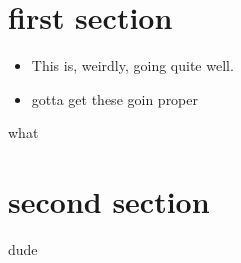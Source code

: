 \documentclass{shard}
\begin{document}
    \section{first section}
    \begin{frame}
        \begin{itemize}
            \item[\bdot]\;\;This is, weirdly, going quite well.
            \item[\bdot]\;\;gotta get these goin proper
        \end{itemize}
    \end{frame}
    \begin{frame}
        what
    \end{frame}
    \section{second section}
    \begin{frame}
        dude
    \end{frame}
\end{document}
